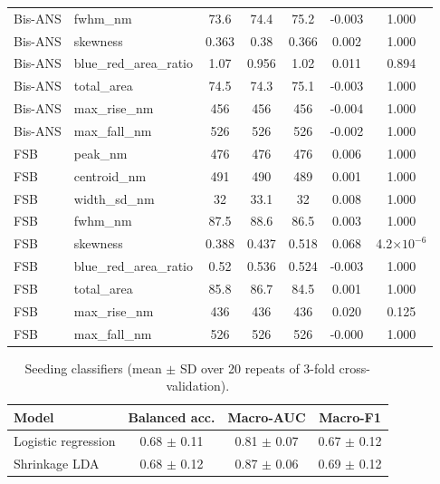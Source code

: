 \begin{table}[!htbp]
\begin{tabular}{llccccc}
Bis-ANS & fwhm\_nm & 73.6 & 74.4 & 75.2 & -0.003 & 1.000 \\
Bis-ANS & skewness & 0.363 & 0.38 & 0.366 & 0.002 & 1.000 \\
Bis-ANS & blue\_red\_area\_ratio & 1.07 & 0.956 & 1.02 & 0.011 & 0.894 \\
Bis-ANS & total\_area & 74.5 & 74.3 & 75.1 & -0.003 & 1.000 \\
Bis-ANS & max\_rise\_nm & 456 & 456 & 456 & -0.004 & 1.000 \\
Bis-ANS & max\_fall\_nm & 526 & 526 & 526 & -0.002 & 1.000 \\
FSB & peak\_nm & 476 & 476 & 476 & 0.006 & 1.000 \\
FSB & centroid\_nm & 491 & 490 & 489 & 0.001 & 1.000 \\
FSB & width\_sd\_nm & 32 & 33.1 & 32 & 0.008 & 1.000 \\
FSB & fwhm\_nm & 87.5 & 88.6 & 86.5 & 0.003 & 1.000 \\
FSB & skewness & 0.388 & 0.437 & 0.518 & 0.068 & 4.2$\times10^{-6}$ \\
FSB & blue\_red\_area\_ratio & 0.52 & 0.536 & 0.524 & -0.003 & 1.000 \\
FSB & total\_area & 85.8 & 86.7 & 84.5 & 0.001 & 1.000 \\
FSB & max\_rise\_nm & 436 & 436 & 436 & 0.020 & 0.125 \\
FSB & max\_fall\_nm & 526 & 526 & 526 & -0.000 & 1.000 \\
\bottomrule
\end{tabular}
\end{table}

\begin{table}[!htbp]
\centering\scriptsize
\caption{Seeding classifiers (mean $\pm$ SD over 20 repeats of 3-fold cross-validation).}\label{tab:s_seeding_models}
\begin{tabular}{lccc}
\toprule
\textbf{Model} & \textbf{Balanced acc.} & \textbf{Macro-AUC} & \textbf{Macro-F1} \\
\midrule
Logistic regression & 0.68 $\pm$ 0.11 & 0.81 $\pm$ 0.07 & 0.67 $\pm$ 0.12 \\
Shrinkage LDA & 0.68 $\pm$ 0.12 & 0.87 $\pm$ 0.06 & 0.69 $\pm$ 0.12 \\
\bottomrule
\end{tabular}
\end{table}

